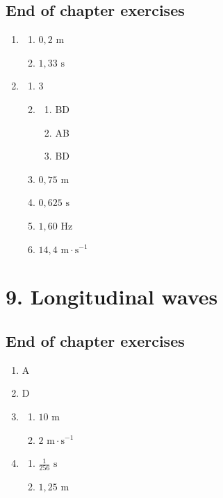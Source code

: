 \subsection{End of chapter exercises} 
\begin{multicols}{4}
\begin{enumerate}[noitemsep, label=\textbf{\arabic*}. ] 
\item %
 \begin{enumerate}[noitemsep, label=\textbf{(\alph*)} ]
\item $0,2 \text{ m}$
\item $1,33 \text{ s}$
\end{enumerate}
\item %
 \begin{enumerate}[noitemsep, label=\textbf{(\alph*)} ]
\item $3$
\item 
\begin{enumerate}[noitemsep, label=\textbf{(\roman*)} ]
\item BD
\item AB
\item BD
\end{enumerate}
\item $0,75 \text{ m}$
\item $0,625 \text{ s}$
\item $1,60 \text{ Hz}$
\item $14,4 \text{ m} \cdot \text{s}^{-1}$
\end{enumerate}
\end{enumerate}
\end{multicols}
\section {9. Longitudinal waves}
\subsection{End of chapter exercises} 
\begin{multicols}{3}
  \begin{enumerate}[noitemsep, label=\textbf{\arabic*}.]
  \item %
A
  \item %
D
  \item %
\begin{enumerate}[noitemsep, label=\textbf{\alph*}.]
 \item $10 \text{ m}$
\item $2 \text{ m} \cdot \text{s}^{-1}$
\end{enumerate} 
  \item %
\begin{enumerate}[noitemsep, label=\textbf{\alph*}.]
 \item $\frac{1}{256} \text{ s}$
\item $1,25 \text{ m}$
\end{enumerate}
  \end{enumerate}
\end{multicols}
